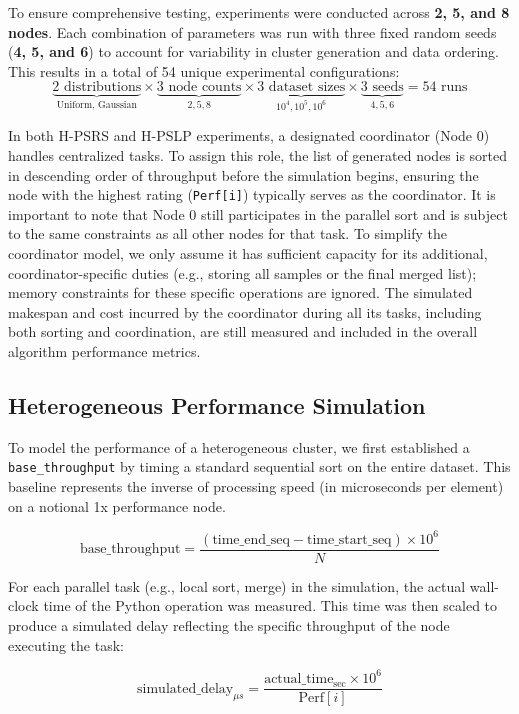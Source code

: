 \documentclass{article}
\begin{document}
To ensure comprehensive testing, experiments were conducted across \textbf{2, 5, and 8 nodes}. Each combination of parameters was run with three fixed random seeds (\textbf{4, 5, and 6}) to account for variability in cluster generation and data ordering. This results in a total of 54 unique experimental configurations:
\[
\underbrace{2 \text{ distributions}}_{\text{Uniform, Gaussian}}
\times \underbrace{3 \text{ node counts}}_{2,5,8}
\times \underbrace{3 \text{ dataset sizes}}_{10^4, 10^5, 10^6}
\times \underbrace{3 \text{ seeds}}_{4,5,6} = 54 \text{ runs}
\]

In both H-PSRS and H-PSLP experiments, a designated coordinator (Node 0) handles centralized tasks. To assign this role, the list of generated nodes is sorted in descending order of throughput before the simulation begins, ensuring the node with the highest rating (\texttt{Perf[i]}) typically serves as the coordinator. It is important to note that Node 0 still participates in the parallel sort and is subject to the same constraints as all other nodes for that task. To simplify the coordinator model, we only assume it has sufficient capacity for its additional, coordinator-specific duties (e.g., storing all samples or the final merged list); memory constraints for these specific operations are ignored. The simulated makespan and cost incurred by the coordinator during all its tasks, including both sorting and coordination, are still measured and included in the overall algorithm performance metrics.


\subsection{Heterogeneous Performance Simulation}

To model the performance of a heterogeneous cluster, we first established a \texttt{base\_throughput} by timing a standard sequential sort on the entire dataset. This baseline represents the inverse of processing speed (in microseconds per element) on a notional 1x performance node.

\[
\text{base\_throughput} = \frac{(\text{time\_end\_seq} - \text{time\_start\_seq}) \times 10^6}{N}
\]

For each parallel task (e.g., local sort, merge) in the simulation, the actual wall-clock time of the Python operation was measured. This time was then scaled to produce a simulated delay reflecting the specific throughput of the node executing the task:

\[
\text{simulated\_delay}_{\mu s} = \frac{\text{actual\_time}_{\text{sec}} \times 10^6}{\text{Perf}[i]}
\]
\end{document}
